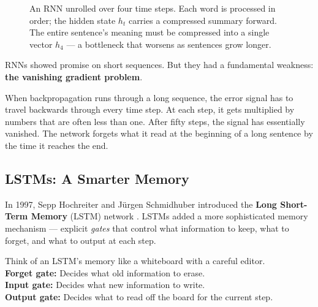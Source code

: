 \begin{figure}[htb]
\centering
{}
\caption{An RNN unrolled over four time steps. Each word is processed in order; the hidden state $h_t$ carries a compressed summary forward. The entire sentence's meaning must be compressed into a single vector $h_4$ --- a bottleneck that worsens as sentences grow longer.}
\end{figure}

RNNs showed promise on short sequences.
But they had a fundamental weakness: \textbf{the vanishing gradient problem}.

When backpropagation runs through a long sequence, the error signal has to travel backwards through every time step.
At each step, it gets multiplied by numbers that are often less than one.
After fifty steps, the signal has essentially vanished.
The network forgets what it read at the beginning of a long sentence by the time it reaches the end.

\subsection{LSTMs: A Smarter Memory}

In 1997, Sepp Hochreiter and Jürgen Schmidhuber introduced the \textbf{Long Short-Term Memory} (LSTM) network \cite{hochreiter1997long}.
LSTMs added a more sophisticated memory mechanism --- explicit \emph{gates} that control what information to keep, what to forget, and what to output at each step.

\begin{tcolorbox}[colback=blue!5!white, colframe=blue!40!black, title=LSTM Gates in Plain English]
Think of an LSTM's memory like a whiteboard with a careful editor. \\
\textbf{Forget gate:} Decides what old information to erase. \\
\textbf{Input gate:} Decides what new information to write. \\
\textbf{Output gate:} Decides what to read off the board for the current step.
\end{tcolorbox}

